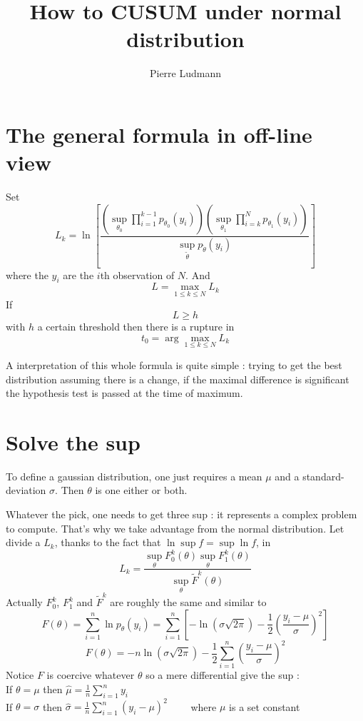 \documentclass[11pt]{article}
\title{\textbf{How to CUSUM under normal distribution}}
\author{Pierre Ludmann}
\begin{document}
\maketitle

\section{The general formula in off-line view}

Set
\[L_k=\ln\left[\frac{\left(\sup_{\theta_0}\prod_{i=1}^{k-1}p_{\theta_0}(y_i)\right)\left(\sup_{\theta_1}\prod_{i=k}^Np_{\theta_1}(y_i)\right)}{\sup_{\tilde\theta}p_{\tilde\theta}(y_i)}\right]\]
where the $y_i$ are the $i$th observation of $N$.
And
\[L=\max_{1\le k\le N}L_k\]
If \[L\ge h\] with $h$ a certain threshold then there is a rupture in \[t_0=\arg\max_{1\le k\le N}L_k\]

A interpretation of this whole formula is quite simple : trying to get the best distribution assuming there is a change, if the maximal difference is significant the hypothesis test is passed at the time of maximum.

\section{Solve the sup}

To define a gaussian distribution, one just requires a mean $\mu$ and a standard-deviation $\sigma$. Then $\theta$ is one either or both.

Whatever the pick, one needs to get three sup : it represents a complex problem to compute. That's why we take advantage from the normal distribution.
Let divide a $L_k$, thanks to the fact that $\ln\sup f=\sup\ln f$, in
\[L_k=\frac{\sup_\theta F^k_0(\theta)\sup_\theta F^k_1(\theta)}{\sup_\theta\tilde F^k(\theta)}\]
Actually $F^k_0$, $F^k_1$ and $\tilde F^k$ are roughly the same and similar to
\[F(\theta)=\sum_{i=1}^n\ln p_\theta(y_i)=\sum_{i=1}^n\left[-\ln(\sigma\sqrt{2\pi})-\frac 12\left(\frac{y_i-\mu}\sigma\right)^2\right]\]
\[F(\theta)=-n\ln(\sigma\sqrt{2\pi})-\frac 12\sum_{i=1}^n\left(\frac{y_i-\mu}\sigma\right)^2\]
Notice $F$ is coercive whatever $\theta$ so a mere differential give the sup :
\\

If $\theta=\mu$ then $\hat\mu=\frac 1n\sum_{i=1}^ny_i$\\

If $\theta=\sigma$ then $\hat\sigma=\frac 1n\sum_{i=1}^n(y_i-\mu)^2$ ~~~~where $\mu$ is a set constant\\
\end{document}
